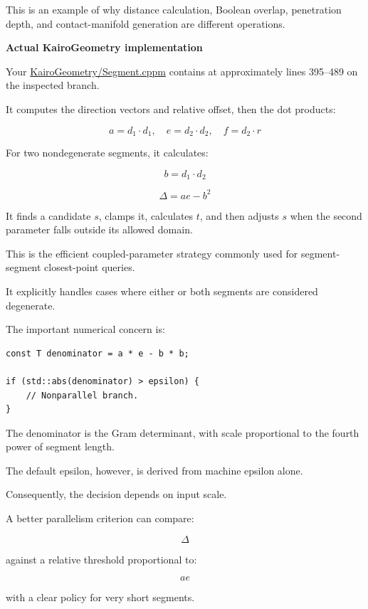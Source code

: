 This is an example of why distance calculation, Boolean overlap, penetration depth, and contact-manifold generation are different operations.

\textbf{Actual KairoGeometry implementation}

Your \href{https://github.com/swayam8624/KairoGeometry/blob/master/Segment.cppm?utm_source=chatgpt.com}{KairoGeometry/Segment.cppm} contains  at approximately lines 395--489 on the inspected  branch.

It computes the direction vectors and relative offset, then the dot products:

\[
a=d_1\cdot d_1,\quad e=d_2\cdot d_2,\quad f=d_2\cdot r
\]

For two nondegenerate segments, it calculates:

\[
b=d_1\cdot d_2
\]

\[
\Delta=ae-b^2
\]

It finds a candidate \(s\), clamps it, calculates \(t\), and then adjusts \(s\) when the second parameter falls outside its allowed domain.

This is the efficient coupled-parameter strategy commonly used for segment-segment closest-point queries.

It explicitly handles cases where either or both segments are considered degenerate.

The important numerical concern is:

\begin{verbatim}
const T denominator = a * e - b * b;

if (std::abs(denominator) > epsilon) {
    // Nonparallel branch.
}
\end{verbatim}

The denominator is the Gram determinant, with scale proportional to the fourth power of segment length.

The default epsilon, however, is derived from machine epsilon alone.

Consequently, the decision depends on input scale.

A better parallelism criterion can compare:

\[
\Delta
\]

against a relative threshold proportional to:

\[
ae
\]

with a clear policy for very short segments.

